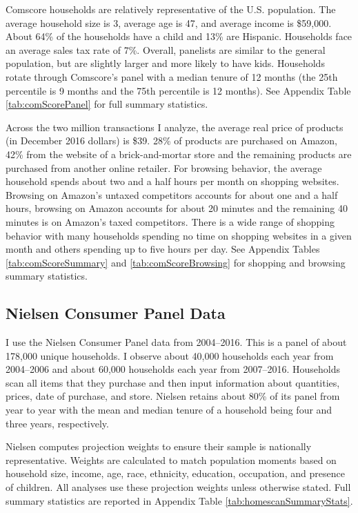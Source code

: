 \documentclass[AEJ,reviewmode]{AEA}
\begin{document}
Comscore households are relatively representative of the U.S. population. The average household size is 3, average age is 47, and average income is \$59,000. About 64\% of the households have a child and 13\% are Hispanic. Households face an average sales tax rate of 7\%. Overall, panelists are similar to the general population, but are slightly larger and more likely to have kids. Households rotate through Comscore's panel with a median tenure of 12 months (the 25th percentile is 9 months and the 75th percentile is 12 months). See Appendix Table \ref{tab:comScorePanel} for full summary statistics.

Across the two million transactions I analyze, the average real price of products (in December 2016 dollars) is \$39. 28\% of products are purchased on Amazon, 42\% from the website of a brick-and-mortar store and the remaining products are purchased from another online retailer. For browsing behavior, the average household spends about two and a half hours per month on shopping websites. Browsing on Amazon's untaxed competitors accounts for about one and a half hours, browsing on Amazon accounts for about 20 minutes and the remaining 40 minutes is on Amazon's taxed competitors. There is a wide range of shopping behavior with many households spending no time on shopping websites in a given month and others spending up to five hours per day. See Appendix Tables \ref{tab:comScoreSummary} and \ref{tab:comScoreBrowsing} for shopping and browsing summary statistics.

\subsection{Nielsen Consumer Panel Data}
I use the Nielsen Consumer Panel data from 2004--2016. This is a panel of about 178,000 unique households. I observe about 40,000 households each year from 2004--2006 and about 60,000 households each year from 2007--2016. Households scan all items that they purchase and then input information about quantities, prices, date of purchase, and store. Nielsen retains about 80\% of its panel from year to year with the mean and median tenure of a household being four and three years, respectively.

Nielsen computes projection weights to ensure their sample is nationally representative. Weights are calculated to match population moments based on household size, income, age, race, ethnicity, education, occupation, and presence of children. All analyses use these projection weights unless otherwise stated. Full summary statistics are reported in Appendix Table \ref{tab:homescanSummaryStats}.
\end{document}
